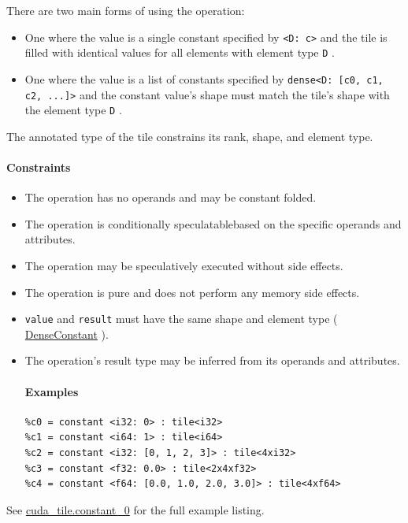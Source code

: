 \documentclass{article}
\begin{document}
There are two main forms of using the operation:


\begin{itemize}
\item One where the value is a single constant specified by \texttt{<D: c>} and the tile is filled with identical values for all elements with element type \texttt{D} .
\item One where the value is a list of constants specified by \texttt{dense<D: [c0, c1, c2, ...]>} and the constant value's shape must match the tile's shape with the element type \texttt{D} .

\end{itemize}
The annotated type of the tile constrains its rank, shape, and element type.



\paragraph{Constraints}

\begin{itemize}
\item The operation has no operands and may be constant folded.
\item The operation is conditionally speculatablebased on the specific operands and attributes.
\item The operation may be speculatively executed without side effects.
\item The operation is pure and does not perform any memory side effects.
\item \texttt{value} and \texttt{result} must have the same shape and element type ( \href{https://docs.nvidia.com/cuda/tile-ir/latest/sections/operations.html#type-denseconstant}{DenseConstant} ).
\item The operation's result type may be inferred from its operands and attributes.


\paragraph{Examples}

\begin{lstlisting}
%c0 = constant <i32: 0> : tile<i32>
%c1 = constant <i64: 1> : tile<i64>
%c2 = constant <i32: [0, 1, 2, 3]> : tile<4xi32>
%c3 = constant <f32: 0.0> : tile<2x4xf32>
%c4 = constant <f64: [0.0, 1.0, 2.0, 3.0]> : tile<4xf64>
\end{lstlisting}

\end{itemize}
See \href{https://docs.nvidia.com/cuda/tile-ir/latest/sections/appendix.html#example-cuda-tile-constant-0}{cuda\_tile.constant\_0} for the full example listing.
\end{document}
